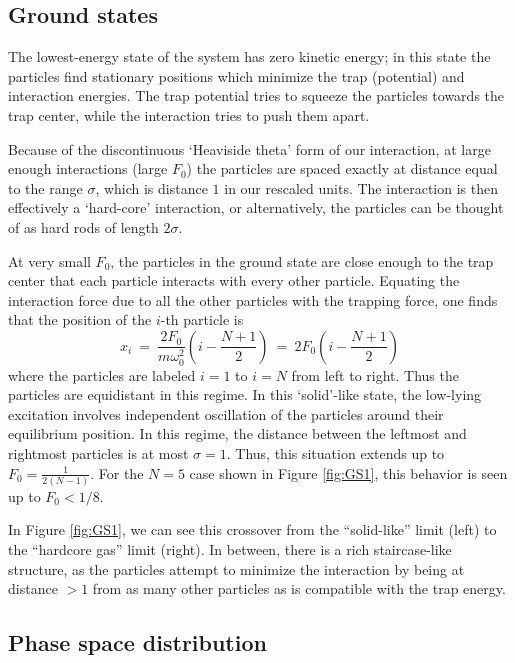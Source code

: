 \documentclass[a4paper, onecolumn]{revtex4-1}
\begin{document}
\subsection{Ground states}

The lowest-energy state of the system has zero kinetic energy; in this state the particles find
stationary positions which minimize the trap (potential) and interaction energies.  The trap
potential tries to squeeze the particles towards the trap center, while the interaction tries to push
them apart.

Because of the discontinuous `Heaviside theta' form of our interaction, at large enough interactions
(large $F_0$) the particles are spaced exactly at distance equal to the range $\sigma$, which is
distance $1$ in our rescaled units.  The interaction is then effectively a `hard-core' interaction,
or alternatively, the particles can be thought of as hard rods of length $2\sigma$. 

At very small $F_0$, the particles in the ground state are close enough to the trap center that each
particle interacts with every other particle.  Equating the interaction force due to all the other
particles with the trapping force, one finds that the position of the $i$-th particle is
\begin{equation}
x_i ~=~ \frac{2F_0}{m\omega_0^2} \left( i - \frac{N+1}{2} \right) ~=~ 2F_0 \left( i - \frac{N+1}{2} \right)
\end{equation}
where the particles are labeled $i=1$ to $i=N$ from left to right.  Thus the particles are
equidistant in this regime.  In this `solid'-like state, the low-lying
excitation involves independent oscillation of the particles around their equilibrium position.
%
In this regime, the distance between the leftmost and rightmost particles is at most $\sigma=1$.
Thus, this situation extends up to $F_0 = \frac{1}{2(N-1)}$.  For the $N=5$ case shown in Figure
\ref{fig:GS1}, this behavior is seen up to $F_0 < 1/8$.


In Figure \ref{fig:GS1}, we can see this crossover from the ``solid-like'' limit (left) to the
``hardcore gas'' limit (right).  In between, there is a rich staircase-like structure, as the
particles attempt to minimize the interaction by being at distance $>1$ from as many other particles
as is compatible with the trap energy.


\subsection{Phase space distribution}
\end{document}

